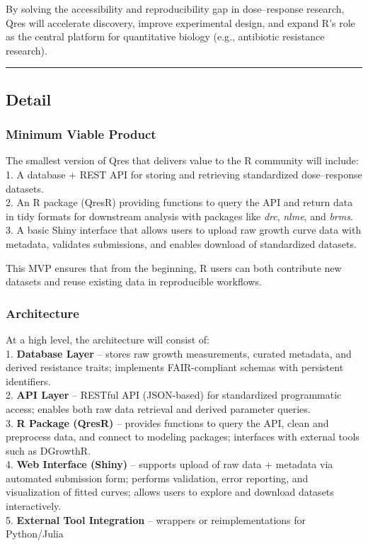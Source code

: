 \documentclass[
]{article}
\begin{document}
By solving the accessibility and reproducibility gap in dose--response
research, Qres will accelerate discovery, improve experimental design,
and expand R's role as the central platform for quantitative biology
(e.g., antibiotic resistance research).

\begin{center}\rule{0.5\linewidth}{0.5pt}\end{center}

\subsection{Detail}\label{detail}

\subsubsection{Minimum Viable Product}\label{minimum-viable-product}

The smallest version of Qres that delivers value to the R community will
include:\\
1. A database + REST API for storing and retrieving standardized
dose--response datasets.\\
2. An R package (QresR) providing functions to query the API and return
data in tidy formats for downstream analysis with packages like
\emph{drc}, \emph{nlme}, and \emph{brms}.\\
3. A basic Shiny interface that allows users to upload raw growth curve
data with metadata, validates submissions, and enables download of
standardized datasets.

This MVP ensures that from the beginning, R users can both contribute
new datasets and reuse existing data in reproducible workflows.

\subsubsection{Architecture}\label{architecture}

At a high level, the architecture will consist of:\\
1. \textbf{Database Layer} -- stores raw growth measurements, curated
metadata, and derived resistance traits; implements FAIR-compliant
schemas with persistent identifiers.\\
2. \textbf{API Layer} -- RESTful API (JSON-based) for standardized
programmatic access; enables both raw data retrieval and derived
parameter queries.\\
3. \textbf{R Package (QresR)} -- provides functions to query the API,
clean and preprocess data, and connect to modeling packages; interfaces
with external tools such as DGrowthR.\\
4. \textbf{Web Interface (Shiny)} -- supports upload of raw data +
metadata via automated submission form; performs validation, error
reporting, and visualization of fitted curves; allows users to explore
and download datasets interactively.\\
5. \textbf{External Tool Integration} -- wrappers or reimplementations
for Python/Julia
\end{document}
